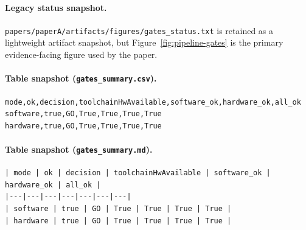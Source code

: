 \paragraph{Legacy status snapshot.}
\texttt{papers/paperA/artifacts/figures/gates\_status.txt} is retained as a lightweight artifact snapshot, but Figure~\ref{fig:pipeline-gates} is the primary evidence-facing figure used by the paper.

\paragraph{Table snapshot (\texttt{gates\_summary.csv}).}
\begin{verbatim}
mode,ok,decision,toolchainHwAvailable,software_ok,hardware_ok,all_ok
software,true,GO,True,True,True,True
hardware,true,GO,True,True,True,True
\end{verbatim}

\paragraph{Table snapshot (\texttt{gates\_summary.md}).}
\begin{verbatim}
| mode | ok | decision | toolchainHwAvailable | software_ok | hardware_ok | all_ok |
|---|---|---|---|---|---|---|
| software | true | GO | True | True | True | True |
| hardware | true | GO | True | True | True | True |
\end{verbatim}

